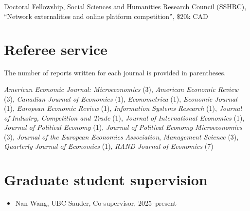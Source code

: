 \documentclass[11pt]{article} %
\begin{document}
  Doctoral Fellowship, Social Sciences and Humanities Research Council (SSHRC),
``Network externalities and online platform competition'',
 \$20k CAD


\section*{Referee service}

The number of reports written for each journal is provided in parentheses.

\vspace{0.2cm}

\textit{American Economic Journal: Microeconomics} (3),
\textit{American Economic Review} (3),
\textit{Canadian Journal of Economics} (1),
\textit{Econometrica} (1),
\textit{Economic Journal} (1),
\textit{European Economic Review} (1),
\textit{Information Systems Research} (1),
\textit{Journal of Industry, Competition and Trade} (1),
\textit{Journal of International Economics} (1),
\textit{Journal of Political Economy} (1),
\textit{Journal of Political Economy Microeconomics} (3),
\textit{Journal of the European Economics Association},
\textit{Management Science} (3),
 \textit{Quarterly Journal of Economics} (1),
\textit{RAND Journal of Economics} (7)


\section*{Graduate student supervision}

\begin{itemize}
	\item Nan Wang, UBC Sauder, Co-supervisor, 2025--present
\end{itemize}

%
%
%
\end{document}
